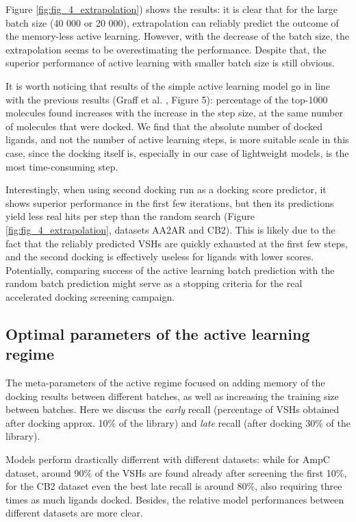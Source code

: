 Figure \ref{fig:fig_4_extrapolation}) shows the results: it is clear that for the large batch size (40 000 or 20 000), extrapolation can reliably predict the outcome of the memory-less active learning. However, with the decrease of the batch size, the extrapolation seems to be overestimating the performance. Despite that, the superior performance of active learning with smaller batch size is still obvious.

It is worth noticing that results of the simple active learning model go in line with the previous results (Graff et al. \cite{Graff2021AcceleratingLearning}, Figure 5): percentage of the top-1000 molecules found increases with the increase in the step size, at the same number of molecules that were docked. We find that the absolute number of docked ligands, and not the number of active learning steps, is more suitable scale in this case, since the docking itself is, especially in our case of lightweight models, is the most time-consuming step.

Interestingly, when using second docking run as a docking score predictor, it shows superior performance in the first few iterations, but then its predictions yield less real hits per step than the random search (Figure \ref{fig:fig_4_extrapolation}, datasets AA2AR and CB2). This is likely due to the fact that the reliably predicted VSHs are quickly exhausted at the first few steps, and the second docking is effectively useless for ligands with lower scores. Potentially, comparing success of the active learning batch prediction with the random batch prediction might serve as a stopping criteria for the real accelerated docking screening campaign.

\subsection{Optimal parameters of the active learning regime}
The meta-parameters of the active regime focused on adding memory of the docking results between different batches, as well as increasing the training size between batches. Here we discuss the \textit{early} recall (percentage of VSHs obtained after docking approx. 10\% of the library) and \textit{late} recall (after docking 30\% of the library).

Models perform drastically differrent with different datasets: while for AmpC dataset, around 90\% of the VSHs are found already after screening the first 10\%, for the CB2 dataset even the best late recall is around 80\%, also requiring three times as much ligands docked. Besides, the relative model performances between different datasets are more clear.

